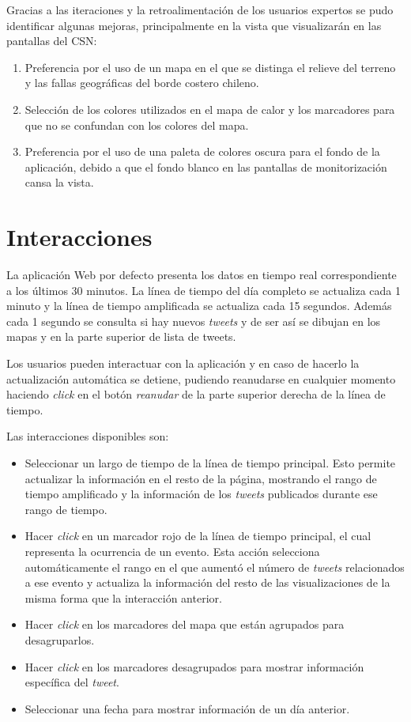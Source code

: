 Gracias a las iteraciones y la retroalimentación de los usuarios expertos se pudo identificar algunas mejoras, principalmente en la vista que visualizarán en las pantallas del CSN:

\begin{enumerate}
\item Preferencia por el uso de un mapa en el que se distinga el relieve del terreno y las fallas geográficas del borde costero chileno.
\item Selección de los colores utilizados en el mapa de calor y los marcadores para que no se confundan con los colores del mapa. 
\item Preferencia por el uso de una paleta de colores oscura para el fondo de la aplicación, debido a que el fondo blanco en las pantallas de monitorización cansa la vista.
\end{enumerate}


\section{Interacciones}

La aplicación Web por defecto presenta los datos en tiempo real correspondiente a los últimos 30 minutos.
La línea de tiempo del día completo se actualiza cada 1 minuto y la línea de tiempo amplificada se actualiza cada 15 segundos. 
Además cada 1 segundo se consulta si hay nuevos \textit{tweets} y de ser así se dibujan en los mapas y en la parte superior de lista de tweets.  

Los usuarios pueden interactuar con la aplicación y en caso de hacerlo la actualización automática se detiene, pudiendo reanudarse en cualquier momento haciendo \textit{click} en el botón \textit{reanudar} de la parte superior derecha de la línea de tiempo. 

Las interacciones disponibles son: 

\begin{itemize}
\item Seleccionar un largo de tiempo de la línea de tiempo principal. Esto permite actualizar la información en el resto de la página, mostrando el rango de tiempo amplificado y la información de los \textit{tweets} publicados durante ese rango de tiempo. 
\item Hacer \textit{click} en un marcador rojo de la línea de tiempo principal, el cual representa la ocurrencia de un evento. Esta acción selecciona automáticamente el rango en el que aumentó el número de \textit{tweets} relacionados a ese evento y actualiza la información del resto de las visualizaciones de la misma forma que la interacción anterior. 
\item Hacer \textit{click} en los marcadores del mapa que están agrupados para desagruparlos.
\item Hacer \textit{click} en los marcadores desagrupados para mostrar información específica del \textit{tweet}.
\item Seleccionar una fecha para mostrar información de un día anterior. 
\end{itemize}



